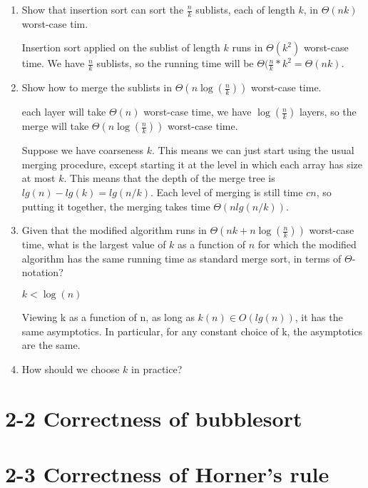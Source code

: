 \documentclass[a4paper, 11pt, UTF8]{article}
\begin{document}
\begin{enumerate}
    \item Show that insertion sort can sort the $\frac{n}{k}$ sublists, each of
        length $k$, in $\Theta(nk)$ worst-case tim.

        Insertion sort applied on the sublist of length $k$ runs in 
        $\Theta(k^2)$ worst-case time. We have $\frac{n}{k}$ sublists, so the 
        running time will be $\Theta(\frac{n}{k}*k^2 = \Theta(nk)$.

    \item Show how to merge the sublists in $\Theta(n\log(\frac{n}{k}))$ 
        worst-case time.

        each layer will take $\Theta(n)$ worst-case time, we have $\log(\frac{n}{k})$
        layers, so the merge will take $\Theta(n\log(\frac{n}{k}))$ worst-case 
        time.

        Suppose we have coarseness $k$. This means we can just start using the
        usual merging procedure, except starting it at the level in which each
        array has size at most $k$. This means that the depth of the merge 
        tree is $lg(n) - lg(k) = lg(n/k)$. Each level of merging is still time
        $cn$, so putting it together, the merging takes time $\Theta(nlg(n/k))$.

    \item Given that the modified algorithm runs in $\Theta(nk+n\log( \frac{n}{k}))$
        worst-case time, what is the largest value of $k$ as a function of $n$ 
        for which the modified algorithm has the same running time as standard
        merge sort, in terms of $\Theta$-notation?

        $k < \log(n)$

        Viewing k as a function of n, as long as $k(n) \in O(lg(n))$, it has 
        the same asymptotics. In particular, for any constant choice of k, the
        asymptotics are the same.
        
    \item How should we choose $k$ in practice?
        
\end{enumerate}


\section*{2-2 Correctness of bubblesort}


\section*{2-3 Correctness of Horner's rule}
\end{document}
